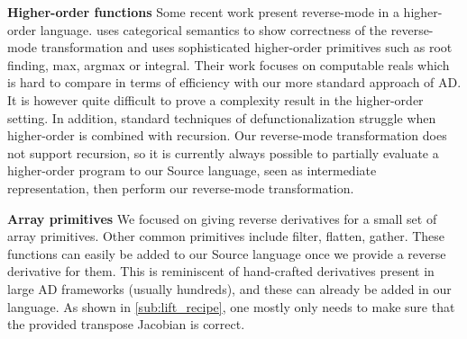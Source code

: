 

\noindent \textbf{Higher-order functions}
Some recent work \cite{vakar2020reverse,sherman2021} present reverse-mode in a higher-order language.
\cite{vakar2020reverse} uses categorical semantics to show correctness of the reverse-mode transformation 
and \cite{sherman2021} uses sophisticated higher-order primitives such as root finding, max, argmax or integral. 
Their work focuses on computable reals which is hard to compare in terms of efficiency with our more standard approach of AD.
It is however quite difficult to prove a complexity result in the higher-order setting. 
In addition, standard techniques of defunctionalization struggle when higher-order is combined with recursion.
Our reverse-mode transformation does not support recursion, 
so it is currently always possible to partially evaluate a higher-order program to our Source language, seen as intermediate representation,
then perform our reverse-mode transformation.

\noindent \textbf{Array primitives}
We focused on giving reverse derivatives for a small set of array primitives. 
Other common primitives include filter, flatten, gather. 
These functions can easily be added to our Source language once we provide a reverse derivative for them.
This is reminiscent of hand-crafted derivatives present in large AD frameworks (usually hundreds), 
and these can already be added in our language. 
As shown in \ref{sub:lift_recipe}, one mostly only needs to make sure that the provided transpose Jacobian is correct.



